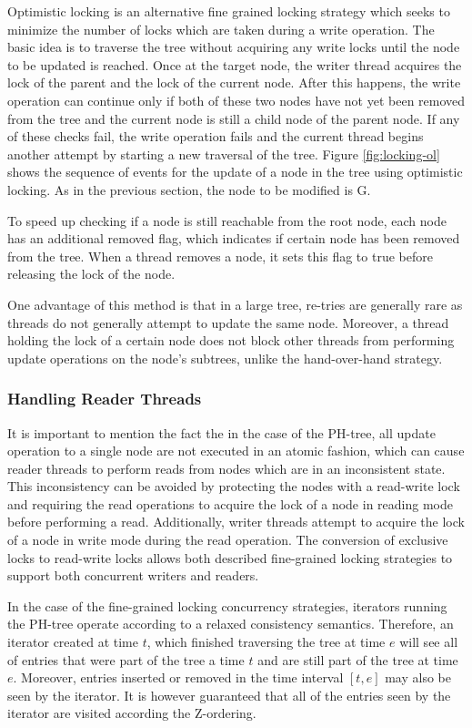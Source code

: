 \documentclass[11pt,a4paper]{globis-book}
\begin{document}
Optimistic locking is an alternative fine grained locking strategy which seeks to minimize the number of locks which are taken during a write operation. The basic idea is to traverse the tree without acquiring any write locks until the node to be updated is reached. Once at the target node, the writer thread acquires the lock of the parent and the lock of the current node. After this happens, the write operation can continue only if both of these two nodes have not yet been removed from the tree and the current node is still a child node of the parent node. If any of these checks fail, the write operation fails and the current thread begins another attempt by starting a new traversal of the tree. Figure \ref{fig:locking-ol} shows the sequence of events for the update of a node in the tree using optimistic locking. As in the previous section, the node to be modified is G. 

To speed up checking if a node is still reachable from the root node, each node has an additional removed flag, which indicates if certain node has been removed from the tree. When a thread removes a node, it sets this flag to true before releasing the lock of the node. 

One advantage of this method is that in a large tree, re-tries are generally rare as threads do not generally attempt to update the same node. Moreover, a thread holding the lock of a certain node does not block other threads from performing update operations on the node's subtrees, unlike the hand-over-hand strategy.

\subsubsection{Handling Reader Threads}
It is important to mention the fact the in the case of the PH-tree, all update operation to a single node are not executed in an atomic fashion, which can cause reader threads to perform reads from nodes which are in an inconsistent state. This inconsistency can be avoided by protecting the nodes with a read-write lock and requiring the read operations to acquire the lock of a node in reading mode before performing a read. Additionally, writer threads attempt to acquire the lock of a node in write mode during the read operation. The conversion of exclusive locks to read-write locks allows both described fine-grained locking strategies to support both concurrent writers and readers. 

In the case of the fine-grained locking concurrency strategies, iterators running the PH-tree operate according to a relaxed consistency semantics. Therefore, an iterator created at time $t$, which finished traversing the tree at time $e$ will see all of entries that were part of the tree a time $t$ and are still part of the tree at time $e$. Moreover, entries inserted or removed in the time interval $[t, e]$ may also be seen by the iterator. It is however guaranteed that all of the entries seen by the iterator are visited according the Z-ordering. 
\end{document}
